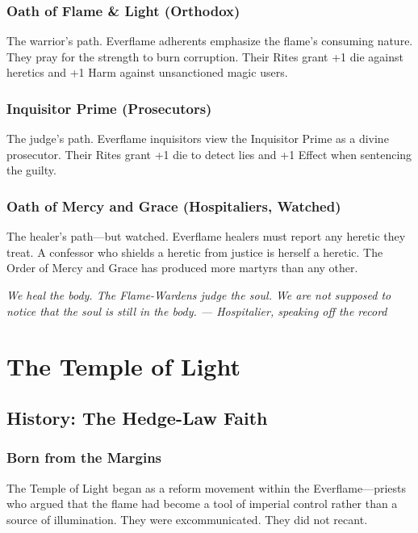 \documentclass{book}
\newcommand{\citation}[1]{\textcolor{marginalia}{\small\textit{#1}}}
\begin{document}
\section{Oath of Flame \& Light (Orthodox)}

The warrior's path. Everflame adherents emphasize the flame's consuming nature. They pray for the strength to burn corruption. Their Rites grant +1 die against heretics and +1 Harm against unsanctioned magic users.

\section{Inquisitor Prime (Prosecutors)}

The judge's path. Everflame inquisitors view the Inquisitor Prime as a divine prosecutor. Their Rites grant +1 die to detect lies and +1 Effect when sentencing the guilty.

\section{Oath of Mercy and Grace (Hospitaliers, Watched)}

The healer's path---but watched. Everflame healers must report any heretic they treat. A confessor who shields a heretic from justice is herself a heretic. The Order of Mercy and Grace has produced more martyrs than any other.

\citation{We heal the body. The Flame-Wardens judge the soul. We are not supposed to notice that the soul is still in the body. --- Hospitalier, speaking off the record}

\part{The Temple of Light}

\chapter{History: The Hedge-Law Faith}

\section{Born from the Margins}

The Temple of Light began as a reform movement within the Everflame---priests who argued that the flame had become a tool of imperial control rather than a source of illumination. They were excommunicated. They did not recant.
\end{document}
